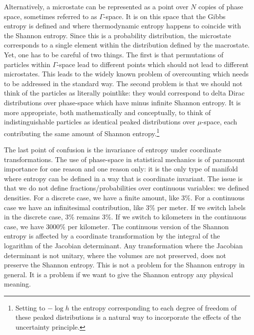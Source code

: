 \documentclass{article}
\begin{document}
Alternatively, a microstate can be represented as a point over $N$ copies of phase space, sometimes referred to as $\Gamma$-space. It is on this space that the Gibbs entropy is defined and where thermodynamic entropy happens to coincide with the Shannon entropy. Since this is a probability distribution, the microstate corresponds to a single element within the distribution defined by the macrostate. Yet, one has to be careful of two things. The first is that permutations of particles within $\Gamma$-space lead to different points which should not lead to different microstates. This leads to the widely known problem of overcounting which needs to be addressed in the standard way. The second problem is that we should not think of the particles as literally pointlike: they would correspond to delta Dirac distributions over phase-space which have minus infinite Shannon entropy. It is more appropriate, both mathematically and conceptually, to think of indistinguishable particles as identical peaked distributions over $\mu$-space, each contributing the same amount of Shannon entropy.\footnote{Setting to $-\log h$ the entropy corresponding to each degree of freedom of these peaked distributions is a natural way to incorporate the effects of the uncertainty principle.}

The last point of confusion is the invariance of entropy under coordinate transformations. The use of phase-space in statistical mechanics is of paramount importance for one reason and one reason only: it is the only type of manifold where entropy can be defined in a way that is coordinate invariant. The issue is that we do not define fractions/probabilities over continuous variables: we defined densities. For a discrete case, we have a finite amount, like 3\%. For a continuous case we have an infinitesimal contribution, like 3\% per meter. If we switch labels in the discrete case, 3\% remains 3\%. If we switch to kilometers in the continuous case, we have 3000\% per kilometer. The continuous version of the Shannon entropy is affected by a coordinate transformation by the integral of the logarithm of the Jacobian determinant. Any transformation where the Jacobian determinant is not unitary, where the volumes are not preserved, does not preserve the Shannon entropy. This is not a problem for the Shannon entropy in general. It is a problem if we want to give the Shannon entropy any physical meaning.
\end{document}
